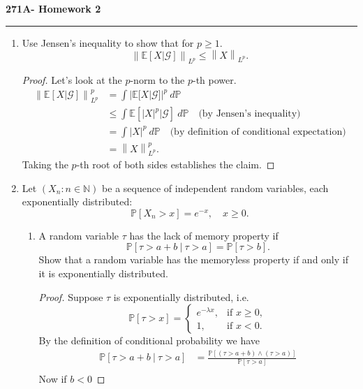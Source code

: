 \documentclass[11pt,letterpaper]{report}
\newcommand{\naturals}{\mathbb{N}}
\newcommand{\mcal}[1]{\mathcal{#1}}
\newcommand{\Lp}[2]{\left\|{#1}\right\|_{L^{#2}}}
\newcommand{\E}{\mathbb{E}}
\newcommand{\prob}{\mathbb{P}}
\begin{document}
\begin{center}
{\bf \Large 271A- Homework 2} %
\vspace{0.2cm}
\hrule
\end{center}

\begin{enumerate}
	\item Use Jensen's inequality to show that for $p\geq 1$.
	\[
	\Lp{\E[X|\mcal{G}]}{p} \leq \Lp{X}{p}.
	\]
	\begin{proof}
		Let's look at the $p$-norm to the $p$-th power.
		\begin{align*}
			\Lp{\E[X|\mcal{G}]}{p}^p &= \int |\E[X|\mcal{G}]|^p\ d\prob\\
			&\leq \int\E[|X|^p|\mcal{G}]\ d\prob\quad\text{(by Jensen's inequality)}\\
			&= \int |X|^p\ d\prob\quad\text{(by definition of conditional expectation)}\\
			&= \Lp{X}{p}^p.
		\end{align*}
		Taking the $p$-th root of both sides establishes the claim.
	\end{proof}

	\item Let $(X_n: n\in \naturals)$ be a sequence of independent random variables, each exponentially distributed:
	\[
	\prob[X_n>x] =e^{-x},\quad x\geq 0.
	\]
	\begin{enumerate}
		\item A random variable $\tau$ has the lack of memory property if
		\[
		\prob[\tau>a+b\ |\ \tau>a] = \prob[\tau>b].
		\]
		Show that a random variable has the memoryless property if and only if it is exponentially distributed.
		\begin{proof}
			Suppose $\tau$ is exponentially distributed, i.e.
			\[
			\prob[\tau > x] = \begin{cases}
				e^{-\lambda x},&\text{if }x\geq 0,\\
				1,&\text{if }x <0.
			\end{cases}
			\]
			By the definition of conditional probability we have 
			\begin{align*}
				\prob[\tau>a+b\ |\ \tau > a] &= \frac{\prob[(\tau>a+b) \land (\tau>a)]}{\prob[\tau>a]}\\
			\end{align*}
			Now if $b<0$
		\end{proof}
	\end{enumerate}
\end{enumerate}
\end{document}
